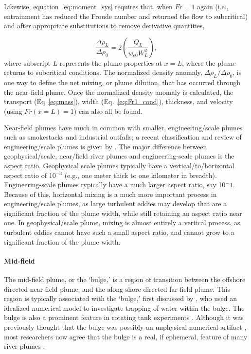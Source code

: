 \documentclass[11pt]{report}
\numberwithin{equation}{section}
\begin{document}
Likewise, equation~\ref{eq:moment_sys} requires that, when $Fr=1$ again (i.e., entrainment has reduced the Froude number and returned the flow to subcritical) and after appropriate substitutions to remove derivative quantities,

\begin{equation}
\frac{\Delta \rho_L}{\Delta \rho_0} = 2 \left(\frac{Q_L}{w_{e0} W_L^2}\right),
\label{eq:Fr1_cond}
\end{equation}
where subscript $L$ represents the plume properties at $x=L$, where the plume returns to subcritical conditions.  The normalized density anomaly, ${\Delta \rho_L}/{\Delta \rho_0}$, is one way to define the net mixing, or plume dilution, that has occurred through the near-field plume.  Once the normalized density anomaly is calculated, the transport (Eq~\ref{eq:mass}), width (Eq.~\ref{eq:Fr1_cond}), thickness, and velocity (using $Fr(x=L)=1$) can also all be found.



Near-field plumes have much in common with smaller, engineering\-/scale plumes such as smokestacks and industrial outfalls; a recent classification and review of engineering\-/scale plumes is given by \citet{jones.ea:07}.  The major difference between geophysical\-/scale, near\-/field river plumes and engineering-scale plumes is the aspect ratio.  Geophysical scale plumes typically have a vertical\-/to\-/horizontal aspect ratio of 10$^{-3}$ (e.g.,  one meter thick to one kilometer in breadth).  Engineering-scale plumes typically have a much larger aspect ratio, say 10$^-1$.  Because of this, horizontal mixing is a much more important process in engineering\-/scale plumes, as large turbulent eddies may develop that are a significant fraction of the plume width, while still retaining an aspect ratio near one.  In geophysical\-/scale plume, mixing is almost entirely a vertical process, as turbulent eddies cannot have such a small aspect ratio, and cannot grow to a significant fraction of the plume width.  

\paragraph{Mid-field}

The mid-field plume, or the `bulge,' is a region of transition between the offshore directed near-field plume, and the along-shore directed far-field plume.  This region is typically associated with the `bulge,' first discussed by \citet{fong.geyer:02}, who used an idealized numerical model to investigate trapping of water within the bulge.  The bulge is also a prominent feature in rotating tank experiments \citep{avicola.huq:03a, avicola.huq:03b, horner-devine.ea:06, huq:09}.  Although it was previously thought that the bulge was possibly an unphysical numerical artifact \citep[e.g.,][]{garvine:01}, most researchers now agree that the bulge is a real, if ephemeral, feature of many river plumes \citep[e.g.,][]{chant.ea:08, horner-devine.ea:08, horner-devine:09}.    
\end{document}
